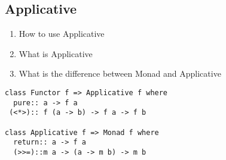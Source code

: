 \documentclass[11pt]{article}
\begin{document}
\subsection{Applicative}
\label{sec:org5de62bf}
\begin{enumerate}
\item How to use Applicative
\item What is Applicative
\item What is the difference between Monad and Applicative
\end{enumerate}
\begin{verbatim}
class Functor f => Applicative f where
  pure:: a -> f a
 (<*>):: f (a -> b) -> f a -> f b

class Applicative f => Monad f where
  return:: a -> f a
  (>>=)::m a -> (a -> m b) -> m b

\end{verbatim}
\end{document}
